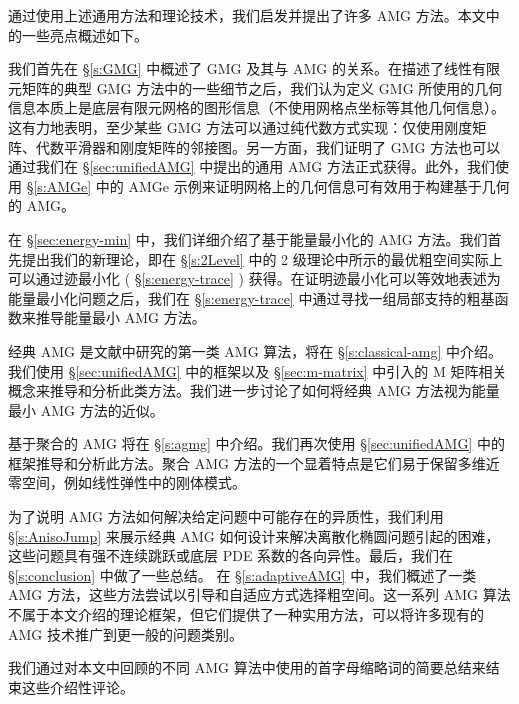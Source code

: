 \documentclass[12pt]{acta_2011xz}
\begin{document}
通过使用上述通用方法和理论技术，我们启发并提出了许多 AMG 方法。本文中的一些亮点概述如下。  

我们首先在
   \S       \ref{s:GMG}    中概述了 GMG 及其与 AMG 的关系。在描述了线性有限元矩阵的典型 GMG 方法中的一些细节之后，我们认为定义 GMG 所使用的几何信息本质上是底层有限元网格的图形信息（不使用网格点坐标等其他几何信息）。这有力地表明，至少某些 GMG 方法可以通过纯代数方式实现：仅使用刚度矩阵、代数平滑器和刚度矩阵的邻接图。另一方面，我们证明了 GMG 方法也可以通过我们在
   \S       \ref{sec:unifiedAMG}    中提出的通用 AMG 方法正式获得。此外，我们使用
   \S       \ref{s:AMGe}    中的 AMGe 示例来证明网格上的几何信息可有效用于构建基于几何的 AMG。  

在    \S       \ref{sec:energy-min}    中，我们详细介绍了基于能量最小化的 AMG 方法。我们首先提出我们的新理论，即在
   \S       \ref{s:2Level}    中的 2 级理论中所示的最优粗空间实际上可以通过迹最小化 (    \S       \ref{s:energy-trace}    ) 获得。在证明迹最小化可以等效地表述为能量最小化问题之后，我们在
   \S       \ref{s:energy-trace}    中通过寻找一组局部支持的粗基函数来推导能量最小 AMG 方法。  

经典 AMG 是文献中研究的第一类 AMG 算法，将在    \S       \ref{s:classical-amg}    中介绍。我们使用    \S       \ref{sec:unifiedAMG}    中的框架以及    \S       \ref{sec:m-matrix}    中引入的 M 矩阵相关概念来推导和分析此类方法。我们进一步讨论了如何将经典 AMG 方法视为能量最小 AMG 方法的近似。  

基于聚合的 AMG 将在    \S       \ref{s:agmg}    中介绍。我们再次使用    \S       \ref{sec:unifiedAMG}    中的框架推导和分析此方法。聚合 AMG 方法的一个显着特点是它们易于保留多维近零空间，例如线性弹性中的刚体模式。  

为了说明 AMG 方法如何解决给定问题中可能存在的异质性，我们利用    \S       \ref{s:AnisoJump}    来展示经典 AMG 如何设计来解决离散化椭圆问题引起的困难，这些问题具有强不连续跳跃或底层 PDE 系数的各向异性。最后，我们在    \S       \ref{s:conclusion}    中做了一些总结。
在    \S       \ref{s:adaptiveAMG}    中，我们概述了一类 AMG 方法，这些方法尝试以引导和自适应方式选择粗空间。这一系列 AMG 算法不属于本文介绍的理论框架，但它们提供了一种实用方法，可以将许多现有的 AMG 技术推广到更一般的问题类别。  

我们通过对本文中回顾的不同 AMG 算法中使用的首字母缩略词的简要总结来结束这些介绍性评论。  
\end{document}
